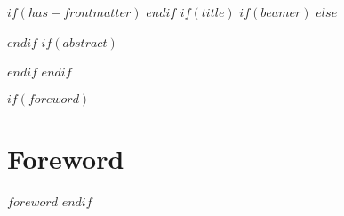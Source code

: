 $if(has-frontmatter)$
\frontmatter
$endif$
$if(title)$
$if(beamer)$
\frame{\titlepage}
$else$
\maketitle
$endif$
$if(abstract)$
\begin{abstract}
$abstract$
\end{abstract}
$endif$
$endif$

$if(foreword)$
\newpage
\section*{Foreword}
$foreword$
$endif$

\newpage
\tableofcontents

\newpage
\listoffigures

\newpage
\listoftables

\newpage
